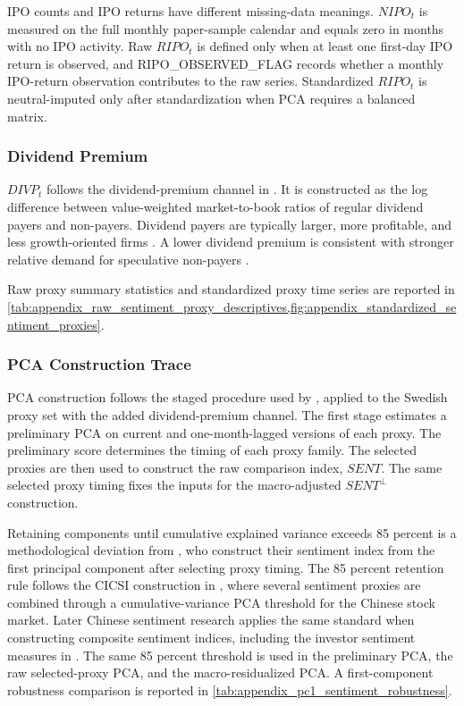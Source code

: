 \documentclass[11pt]{article}
\newcommand{\var}[1]{\ensuremath{#1}}
\newcommand{\repo}[1]{\textnormal{\small #1}}
\begin{document}
IPO counts and IPO returns have different missing-data meanings. \var{NIPO_t} is measured on the full monthly paper-sample calendar and equals zero in months with no IPO activity. Raw \var{RIPO_t} is defined only when at least one first-day IPO return is observed, and \repo{RIPO\_OBSERVED\_FLAG} records whether a monthly IPO-return observation contributes to the raw series. Standardized \var{RIPO_t} is neutral-imputed only after standardization when PCA requires a balanced matrix.

\subsubsection{Dividend Premium}
\var{DIVP_t} follows the dividend-premium channel in \citet{baker2006sentiment}. It is constructed as the log difference between value-weighted market-to-book ratios of regular dividend payers and non-payers. Dividend payers are typically larger, more profitable, and less growth-oriented firms \citep{fama2001disappearing}. A lower dividend premium is consistent with stronger relative demand for speculative non-payers \citep{baker2004catering,baker2006sentiment}.

Raw proxy summary statistics and standardized proxy time series are reported in \cref{tab:appendix_raw_sentiment_proxy_descriptives,fig:appendix_standardized_sentiment_proxies}.

\subsubsection{PCA Construction Trace}
PCA construction follows the staged procedure used by \citet{zhang2023sweden}, applied to the Swedish proxy set with the added dividend-premium channel. The first stage estimates a preliminary PCA on current and one-month-lagged versions of each proxy. The preliminary score determines the timing of each proxy family. The selected proxies are then used to construct the raw comparison index, \var{SENT}. The same selected proxy timing fixes the inputs for the macro-adjusted \var{SENT^{\perp}} construction.

Retaining components until cumulative explained variance exceeds 85 percent is a methodological deviation from \citet{baker2006sentiment}, who construct their sentiment index from the first principal component after selecting proxy timing. The 85 percent retention rule follows the CICSI construction in \citet{yi2009cicsi}, where several sentiment proxies are combined through a cumulative-variance PCA threshold for the Chinese stock market. Later Chinese sentiment research applies the same standard when constructing composite sentiment indices, including the investor sentiment measures in \citet{guo2026epu}. The same 85 percent threshold is used in the preliminary PCA, the raw selected-proxy PCA, and the macro-residualized PCA. A first-component robustness comparison is reported in \cref{tab:appendix_pc1_sentiment_robustness}.
\end{document}
